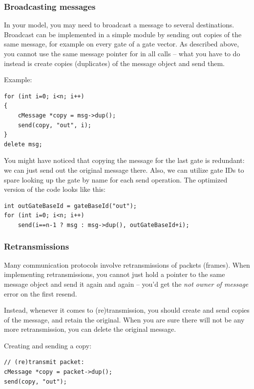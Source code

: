 \subsubsection{Broadcasting messages}

In your model, you may need to broadcast a message to several destinations.
Broadcast can be implemented in a simple module by sending out copies
of the same message, for example on every gate of a gate vector.
As described above, you cannot use the same message pointer for
in all  calls -- what you have to do instead is
create copies (duplicates) of the message object and send them.

Example:

\begin{verbatim}
for (int i=0; i<n; i++)
{
    cMessage *copy = msg->dup();
    send(copy, "out", i);
}
delete msg;
\end{verbatim}

You might have noticed that copying the message for the last gate is
redundant: we can just send out the original message there.
Also, we can utilize gate IDs to spare looking up the gate by name
for each send operation. The optimized version of the code looks
like this:

\begin{verbatim}
int outGateBaseId = gateBaseId("out");
for (int i=0; i<n; i++)
    send(i==n-1 ? msg : msg->dup(), outGateBaseId+i);
\end{verbatim}


\subsubsection{Retransmissions}

Many communication protocols involve retransmissions of packets (frames).
When implementing retransmissions, you cannot just hold a pointer
to the same message object and send it again and again -- you'd get
the \textit{not owner of message} error on the first resend.

Instead, whenever it comes to (re)transmission, you should create and
send copies of the message, and retain the original.
When you are sure there will not be any more retransmission,
you can delete the original message.

Creating and sending a copy:

\begin{verbatim}
// (re)transmit packet:
cMessage *copy = packet->dup();
send(copy, "out");
\end{verbatim}

